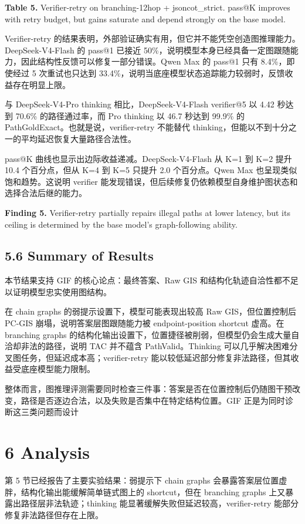 \documentclass[
  11pt,
]{article}
\begin{document}
\textbf{Table 5.} Verifier-retry on branching-12hop + jsoncot\_strict.
pass@K improves with retry budget, but gains saturate and depend
strongly on the base model.

Verifier-retry
的结果表明，外部验证确实有用，但它并不能凭空创造图推理能力。DeepSeek-V4-Flash
的 pass@1 已接近
50\%，说明模型本身已经具备一定图跟随能力，因此结构性反馈可以修复一部分错误。Qwen
Max 的 pass@1 只有 8.4\%，即使经过 5 次重试也只达到
33.4\%，说明当底座模型状态追踪能力较弱时，反馈收益存在明显上限。

与 DeepSeek-V4-Pro thinking 相比，DeepSeek-V4-Flash verifier@5 以 4.42
秒达到 70.6\% 的路径通过率，而 Pro thinking 以 46.7 秒达到 99.9\% 的
PathGoldExact。也就是说，verifier-retry 不能替代
thinking，但能以不到十分之一的平均延迟恢复大量路径合法性。

pass@K 曲线也显示出边际收益递减。DeepSeek-V4-Flash 从 K=1 到 K=2 提升
10.4 个百分点，但从 K=4 到 K=5 只提升 2.0 个百分点。Qwen Max
也呈现类似饱和趋势。这说明 verifier
能发现错误，但后续修复仍依赖模型自身维护图状态和选择合法后继的能力。

\textbf{Finding 5.} Verifier-retry partially repairs illegal paths at
lower latency, but its ceiling is determined by the base model's
graph-following ability.

\subsection{5.6 Summary of Results}\label{summary-of-results}

本节结果支持 GIF 的核心论点：最终答案、Raw GIS
和结构化轨迹自洽性都不足以证明模型忠实使用图结构。

在 chain graphs 的弱提示设置下，模型可能表现出较高 Raw GIS，但位置控制后
PC-GIS 崩塌，说明答案层图跟随能力被 endpoint-position shortcut 虚高。在
branching graphs
的结构化输出设置下，位置捷径被削弱，但模型仍会生成大量自洽却非法的路径，说明
TAC 并不蕴含 PathValid。Thinking
可以几乎解决困难分叉图任务，但延迟成本高；verifier-retry
能以较低延迟部分修复非法路径，但其收益受底座模型能力限制。

整体而言，图推理评测需要同时检查三件事：答案是否在位置控制后仍随图干预改变，路径是否逐边合法，以及失败是否集中在特定结构位置。GIF
正是为同时诊断这三类问题而设计

\section{6 Analysis}\label{analysis}

第 5 节已经报告了主要实验结果：弱提示下 chain graphs
会暴露答案层位置虚胖，结构化输出能缓解简单链式图上的 shortcut，但在
branching graphs 上又暴露出路径层非法轨迹；thinking
能显著缓解失败但延迟较高，verifier-retry 能部分修复非法路径但存在上限。
\end{document}
